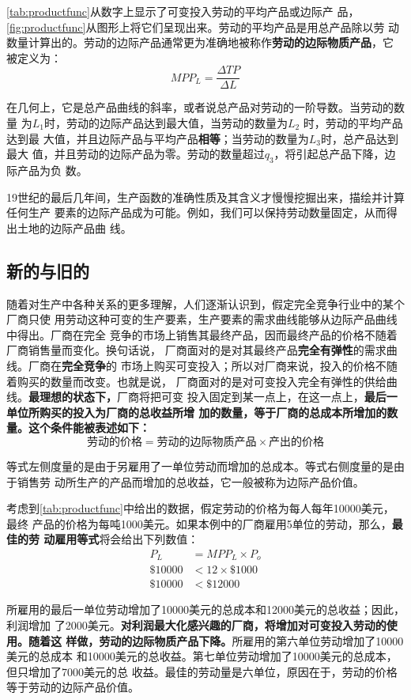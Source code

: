 \cref{tab:productfunc}从数字上显示了可变投入劳动的平均产品或边际产
品，\cref{fig:productfunc}从图形上将它们呈现出来。劳动的平均产品是用总产品除以劳
动数量计算出的。劳动的边际产品通常更为准确地被称作\textbf{劳动的边际物质产品}，它
被定义为：
\[MPP_L=\frac{\Delta TP}{\Delta L}\]

在几何上，它是总产品曲线的斜率，或者说总产品对劳动的一阶导数。当劳动的数量
为$L_1$时，劳动的边际产品达到最大值，当劳动的数量为$L_2$ 时，劳动的平均产品达到最
大值，并且边际产品与平均产品\textbf{相等}；当劳动的数量为$L_3$时，总产品达到最大
值，并且劳动的边际产品为零。劳动的数量超过$q_3$，将引起总产品下降，边际产品为负
数。

19世纪的最后几年间，生产函数的准确性质及其含义才慢慢挖掘出来，描绘并计算任何生产
要素的边际产品成为可能。例如，我们可以保持劳动数量固定，从而得出土地的边际产品曲
线。

\subsection{新的与旧的}

随着对生产中各种关系的更多理解，人们逐渐认识到，假定完全竞争行业中的某个厂商只使
用劳动这种可变的生产要素，生产要素的需求曲线能够从边际产品曲线中得出。厂商在完全
竞争的市场上销售其最终产品，因而最终产品的价格不随着厂商销售量而变化。换句话说，
厂商面对的是对其最终产品\textbf{完全有弹性}的需求曲线。厂商在\textbf{完全竞争}的
市场上购买可变投入；所以对厂商来说，投入的价格不随着购买的数量而改变。也就是说，
厂商面对的是对可变投入完全有弹性的供给曲线。\textbf{最理想的状态下，}厂商将把可变
投入固定到某一点上，在这一点上，\textbf{最后一单位所购买的投入为厂商的总收益所增
  加的数量，等于厂商的总成本所增加的数量。这个条件能被表述如下：}
\[劳动的价格=劳动的边际物质产品 \times 产出的价格\]

等式左侧度量的是由于另雇用了一单位劳动而增加的总成本。等式右侧度量的是由于销售劳
动所生产的产品而增加的总收益，它一般被称为边际产品价值。

考虑到\cref{tab:productfunc}中给出的数据，假定劳动的价格为每人每年10000美元，最终
产品的价格为每吨1000美元。如果本例中的厂商雇用5单位的劳动，那么，\textbf{最佳的劳
  动雇用等式}将会给出下列数值：
\begin{align*}
  P_L &=MPP_L \times P_o\\
  \$ 10000 &< 12 \times \$1000\\
  \$ 10000 &< \$ 12000
\end{align*}

所雇用的最后一单位劳动增加了10000美元的总成本和12000美元的总收益；因此，利润增加
了2000美元。\textbf{对利润最大化感兴趣的厂商，将增加对可变投入劳动的使用。随着这
  样做，劳动的边际物质产品下降。}所雇用的第六单位劳动增加了10000美元的总成本
和10000美元的总收益。第七单位劳动增加了10000美元的总成本，但只增加了7000美元的总
收益。最佳的劳动量是六单位，原因在于，劳动的价格等于劳动的边际产品价值。

